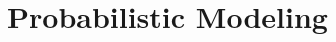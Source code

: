 \documentclass[letterpaper]{article} %
\begin{document}




%
%

%












%
%
 
%






\section{Probabilistic Modeling}
%
%
\end{document}
